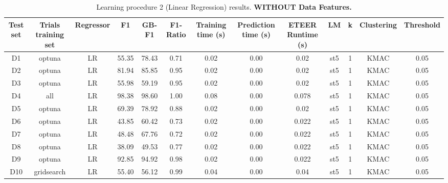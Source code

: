 \begin{table*}[ht!]
{\footnotesize
\begin{center}  
\caption{Learning procedure 2 (Linear Regression) results. \textbf{WITHOUT Data Features.}} 
\label{tab:lr-without-data-features}
\begin{tabular}{|c|c|c|c|c|c|c|c|c|c|c|c|c|}
\toprule
Test set & Trials training set & Regressor & F1 & GB-F1 & F1-Ratio & Training time (s) & Prediction time (s) & ETEER Runtime (s) & LM & k & Clustering & Threshold \\
\midrule
D1 & optuna & LR & 55.35 & 78.43 & 0.71 & 0.02 & 0.00 & 0.02 & st5 & 1 & KMAC & 0.05 \\
D2 & optuna & LR & 81.94 & 85.85 & 0.95 & 0.02 & 0.00 & 0.02 & st5 & 1 & KMAC & 0.05 \\
D3 & optuna & LR & 55.98 & 59.19 & 0.95 & 0.02 & 0.00 & 0.02 & st5 & 1 & KMAC & 0.05 \\
D4 & all & LR & 98.38 & 98.60 & 1.00 & 0.08 & 0.00 & 0.078 & st5 & 1 & KMAC & 0.05 \\
D5 & optuna & LR & 69.39 & 78.92 & 0.88 & 0.02 & 0.00 & 0.02 & st5 & 1 & KMAC & 0.05 \\
D6 & optuna & LR & 43.85 & 60.42 & 0.73 & 0.02 & 0.00 & 0.022 & st5 & 1 & KMAC & 0.05 \\
D7 & optuna & LR & 48.48 & 67.76 & 0.72 & 0.02 & 0.00 & 0.022 & st5 & 1 & KMAC & 0.05 \\
D8 & optuna & LR & 38.09 & 49.53 & 0.77 & 0.02 & 0.00 & 0.022 & st5 & 1 & KMAC & 0.05 \\
D9 & optuna & LR & 92.85 & 94.92 & 0.98 & 0.02 & 0.00 & 0.022 & st5 & 1 & KMAC & 0.05 \\
D10 & gridsearch & LR & 55.40 & 56.12 & 0.99 & 0.04 & 0.00 & 0.04 & st5 & 1 & KMAC & 0.05 \\
\bottomrule
\end{tabular}
\end{center}  
}
\end{table*}